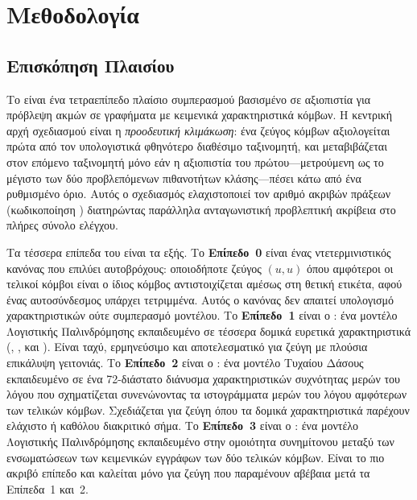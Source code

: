 

\chapter{Μεθοδολογία}
\label{ch:methodology}


\section{Επισκόπηση Πλαισίου}
\label{sec:framework-overview}

Το  είναι ένα τετραεπίπεδο πλαίσιο συμπερασμού βασισμένο σε αξιοπιστία
για πρόβλεψη ακμών σε γραφήματα με κειμενικά χαρακτηριστικά κόμβων.
Η κεντρική αρχή
σχεδιασμού είναι η \textit{προοδευτική κλιμάκωση}: ένα ζεύγος κόμβων αξιολογείται
πρώτα από τον υπολογιστικά φθηνότερο διαθέσιμο ταξινομητή, και μεταβιβάζεται στον
επόμενο ταξινομητή μόνο εάν η αξιοπιστία του πρώτου---μετρούμενη ως το μέγιστο των
δύο προβλεπόμενων πιθανοτήτων κλάσης---πέσει κάτω από ένα ρυθμισμένο όριο.
Αυτός ο
σχεδιασμός ελαχιστοποιεί τον αριθμό ακριβών πράξεων (κωδικοποίηση
) διατηρώντας παράλληλα ανταγωνιστική προβλεπτική ακρίβεια
στο πλήρες σύνολο ελέγχου.

Τα τέσσερα επίπεδα του  είναι τα εξής.
Το \textbf{Επίπεδο~0} είναι ένας
ντετερμινιστικός κανόνας που επιλύει αυτοβρόχους: οποιοδήποτε ζεύγος $(u, u)$ όπου
αμφότεροι οι τελικοί κόμβοι είναι ο ίδιος κόμβος αντιστοιχίζεται αμέσως στη θετική
ετικέτα, αφού ένας αυτοσύνδεσμος υπάρχει τετριμμένα.
Αυτός ο κανόνας δεν απαιτεί
υπολογισμό χαρακτηριστικών ούτε συμπερασμό μοντέλου.
Το \textbf{Επίπεδο~1} είναι ο
\texttt{}: ένα μοντέλο Λογιστικής Παλινδρόμησης εκπαιδευμένο σε
τέσσερα δομικά ευρετικά χαρακτηριστικά (, ,  και ). Είναι ταχύ,
ερμηνεύσιμο και αποτελεσματικό για ζεύγη με πλούσια επικάλυψη γειτονιάς.
Το \textbf{Επίπεδο~2} είναι ο \texttt{}: ένα μοντέλο Τυχαίου Δάσους
εκπαιδευμένο σε ένα 72-διάστατο διάνυσμα χαρακτηριστικών συχνότητας μερών του λόγου
που σχηματίζεται συνενώνοντας τα ιστογράμματα μερών του λόγου αμφότερων των τελικών
κόμβων.
Σχεδιάζεται για ζεύγη  όπου τα δομικά χαρακτηριστικά
παρέχουν ελάχιστο ή καθόλου διακριτικό σήμα.
Το \textbf{Επίπεδο~3} είναι ο
\texttt{}: ένα μοντέλο Λογιστικής Παλινδρόμησης εκπαιδευμένο
στην ομοιότητα συνημίτονου μεταξύ των ενσωματώσεων  των
κειμενικών εγγράφων των δύο τελικών κόμβων.
Είναι το πιο ακριβό επίπεδο και καλείται
μόνο για ζεύγη που παραμένουν αβέβαια μετά τα Επίπεδα~1 και~2.

